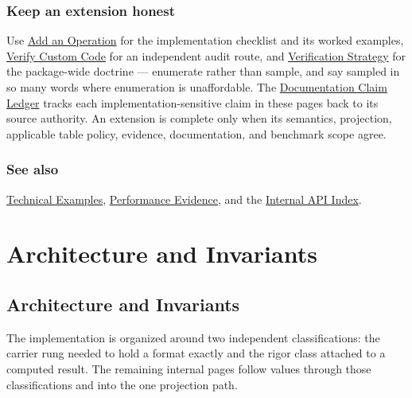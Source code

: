 \subsection{Keep an extension honest}



\label{8702783171499005706}{}


Use \href{internals\_\allowbreak{}add\_\allowbreak{}operation.md}{Add an Operation} for the implementation checklist and its worked examples, \href{internals\_\allowbreak{}verify\_\allowbreak{}custom.md}{Verify Custom Code} for an independent audit route, and \href{internals\_\allowbreak{}verification.md}{Verification Strategy} for the package-wide doctrine — enumerate rather than sample, and say {\textquotedbl}sampled{\textquotedbl} in so many words where enumeration is unaffordable. The \href{claim\_\allowbreak{}ledger.md}{Documentation Claim Ledger} tracks each implementation-sensitive claim in these pages back to its source authority. An extension is complete only when its semantics, projection, applicable table policy, evidence, documentation, and benchmark scope agree.



\subsection{See also}



\label{292862844209942199-dup16}{}


\href{examples\_\allowbreak{}verification.md}{Technical Examples}, \href{examples\_\allowbreak{}performance.md}{Performance Evidence}, and the \href{reference\_\allowbreak{}internal\_\allowbreak{}api.md}{Internal API Index}.



\chapter{Architecture and Invariants}


\section{Architecture and Invariants}



\label{16159183052638609760}{}


The implementation is organized around two independent classifications: the carrier rung needed to hold a format exactly and the rigor class attached to a computed result. The remaining internal pages follow values through those classifications and into the one projection path.



